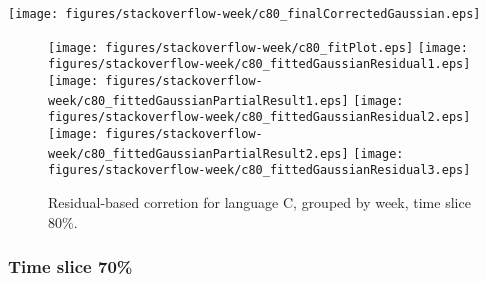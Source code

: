 \begin{center}
{\texttt{[image: figures/stackoverflow-week/c80\_finalCorrectedGaussian.eps]}}
\end{center}

\FloatBarrier

\begin{figure}[t]
\centering
{}
{\texttt{[image: figures/stackoverflow-week/c80\_fitPlot.eps]}}
{\texttt{[image: figures/stackoverflow-week/c80\_fittedGaussianResidual1.eps]}}
{\texttt{[image: figures/stackoverflow-week/c80\_fittedGaussianPartialResult1.eps]}}
{\texttt{[image: figures/stackoverflow-week/c80\_fittedGaussianResidual2.eps]}}
{\texttt{[image: figures/stackoverflow-week/c80\_fittedGaussianPartialResult2.eps]}}
{\texttt{[image: figures/stackoverflow-week/c80\_fittedGaussianResidual3.eps]}}
\caption{Residual-based corretion for language C, grouped by week, time slice 80\%.}
\end{figure}


\FloatBarrier


\subsubsection{Time slice 70\%}

